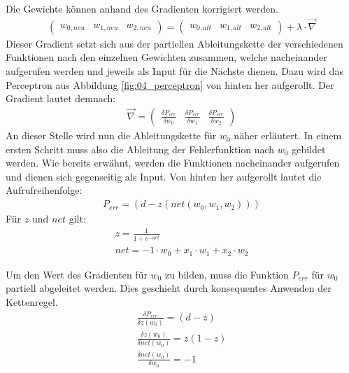 Die Gewichte können anhand des Gradienten korrigiert werden.
\begin{align}
    \begin{pmatrix}w_{0, neu} & w_{1, neu} & w_{2, neu}\end{pmatrix} = \begin{pmatrix}w_{0, alt} & w_{1, alt} & w_{2, alt}\end{pmatrix} + \lambda \cdot \vec{\nabla}
\end{align}
Dieser Gradient setzt sich aus der partiellen Ableitungskette der verschiedenen Funktionen nach den einzelnen
Gewichten zusammen, welche nacheinander aufgerufen werden und jeweils als Input für die Nächste dienen.
Dazu wird das Perceptron aus Abbildung \ref{fig:04_perceptron} von hinten her aufgerollt. Der Gradient lautet demnach:
\begin{align}
    \vec{\nabla} = \begin{pmatrix}\frac{\delta P_{err}}{\delta w_0} & \frac{\delta P_{err}}{\delta w_1} & \frac{\delta P_{err}}{\delta w_2} \end{pmatrix}
\end{align}
An dieser Stelle wird nun die Ableitungskette für $w_0$ näher erläutert. In einem ersten Schritt muss also die
Ableitung der Fehlerfunktion nach $w_0$ gebildet werden. Wie bereits erwähnt, werden die Funktionen nacheinander
aufgerufen und dienen sich gegenseitig als Input. Von hinten her aufgerollt lautet die Aufrufreihenfolge:
\begin{align}
    P_{err} = (d - z(net(w_0, w_1, w_2)))
\end{align}
Für $z$ und $net$ gilt:
\begin{align}
    z = \frac{1}{1 + e^{-net}}\\
    net = -1 \cdot w_0 + x_1 \cdot w_1 + x_2 \cdot w_2
\end{align}

Um den Wert des Gradienten für $w_0$ zu bilden, muss die Funktion $P_{err}$ für $w_0$ partiell abgeleitet
werden. Dies geschieht durch konsequentes Anwenden der Kettenregel.
\begin{align}
    \frac{\delta P_{err}}{\delta z(w_0)} = (d - z)\\
    \frac{\delta z(w_0)}{\delta net(w_0)} = z (1 - z)\\
    \frac{\delta net(w_0)}{\delta w_0} = -1
\end{align}

